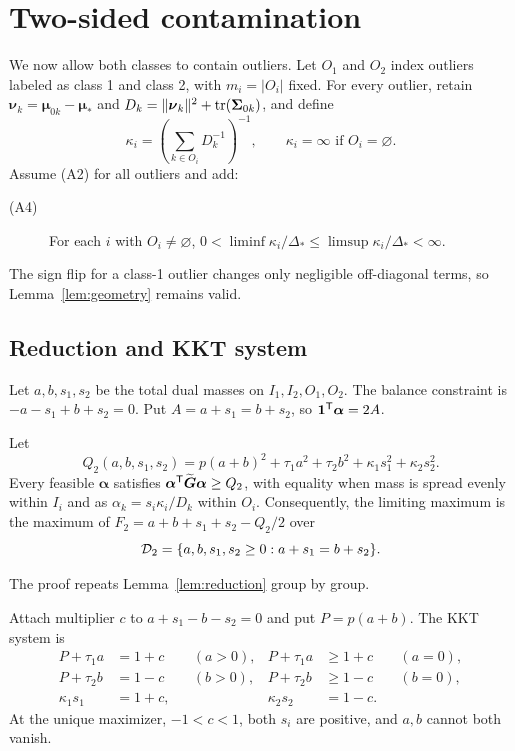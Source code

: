 \section{Two-sided contamination}\label{sec:two-sided}
We now allow both classes to contain outliers. Let $O_1$ and $O_2$ index outliers labeled as class 1 and class 2, with $m_i=|O_i|$ fixed. For every outlier, retain
$\boldsymbol\nu_k=\boldsymbol\mu_{0k}-\boldsymbol\mu_*$ and
$D_k=\lVert\boldsymbol\nu_k\rVert^2+\operatorname{tr}(\boldsymbol\Sigma_{0k})$, and define
\begin{equation}\label{eq:kappai}
\kappa_i=\left(\sum_{k\in O_i}D_k^{-1}\right)^{-1},
\qquad \kappa_i=\infty\text{ if }O_i=\varnothing.
\end{equation}
Assume (A2) for all outliers and add:
\begin{description}
\item[(A4)] For each $i$ with $O_i\ne\varnothing$,
$0<\liminf\kappa_i/\Delta_*\le\limsup\kappa_i/\Delta_*<\infty$.
\end{description}
The sign flip for a class-1 outlier changes only negligible off-diagonal terms, so Lemma~\ref{lem:geometry} remains valid.

\subsection{Reduction and KKT system}
Let $a,b,s_1,s_2$ be the total dual masses on $I_1,I_2,O_1,O_2$. The balance constraint is
$-a-s_1+b+s_2=0$. Put
$A=a+s_1=b+s_2$, so $\mathbf{1}^{\mathsf{T}}\boldsymbol\alpha=2A$.

\begin{lemma}\label{lem:four}
Let
\[
Q_2(a,b,s_1,s_2)=p(a+b)^2+\tau_1a^2+\tau_2b^2+\kappa_1s_1^2+\kappa_2s_2^2.
\]
Every feasible $\boldsymbol\alpha$ satisfies
$\boldsymbol\alpha^{\mathsf{T}}\widetilde{\boldsymbol G}\boldsymbol\alpha\ge Q_2$, with equality when mass is spread evenly within $I_i$ and as $\alpha_k=s_i\kappa_i/D_k$ within $O_i$. Consequently, the limiting maximum is the maximum of
$F_2=a+b+s_1+s_2-Q_2/2$ over
\[
\mathcal{D}_2=\{a,b,s_1,s_2\ge0:a+s_1=b+s_2\}.
\]
\end{lemma}
The proof repeats Lemma~\ref{lem:reduction} group by group.

Attach multiplier $c$ to $a+s_1-b-s_2=0$ and put $P=p(a+b)$. The KKT system is
\begin{align}\label{eq:kkt-two}
P+\tau_1a&=1+c &&(a>0),& P+\tau_1a&\ge1+c&&(a=0),\nonumber\\
P+\tau_2b&=1-c &&(b>0),& P+\tau_2b&\ge1-c&&(b=0),\\
\kappa_1s_1&=1+c,&&& \kappa_2s_2&=1-c.&&\nonumber
\end{align}
At the unique maximizer, $-1<c<1$, both $s_i$ are positive, and $a,b$ cannot both vanish.

